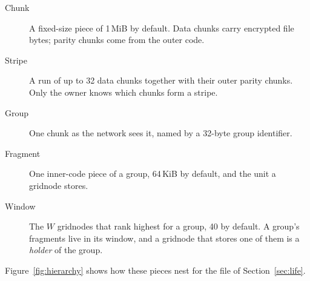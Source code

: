 \documentclass[10pt,a4paper,final]{article}
\begin{document}
\begin{description}
	\item[Chunk] A fixed-size piece of 1\,MiB by default. Data chunks carry encrypted file bytes; parity chunks come
	      from the outer code.
	\item[Stripe] A run of up to 32 data chunks together with their outer parity chunks. Only the owner knows which
	      chunks form a stripe.
	\item[Group] One chunk as the network sees it, named by a 32-byte group identifier.
	\item[Fragment] One inner-code piece of a group, 64\,KiB by default, and the unit a gridnode stores.
	\item[Window] The $W$ gridnodes that rank highest for a group, 40 by default. A group's fragments live in its
	      window, and a gridnode that stores one of them is a \emph{holder} of the group.
\end{description}

Figure~\ref{fig:hierarchy} shows how these pieces nest for the file of Section~\ref{sec:life}.
\end{document}
